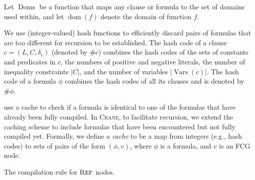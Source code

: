 \documentclass[letterpaper]{article} %
\DeclareMathOperator{\Reff}{\textsc{Ref}}
\DeclareMathOperator{\dom}{dom}
\DeclareMathOperator{\Doms}{Doms}
\DeclareMathOperator{\Vars}{Vars}
\theoremstyle{definition}
\begin{document}
Let $\Doms$ be a function that maps any clause or formula to the set of domains
used within, and let $\dom(f)$ denote the domain of function $f$.

We use (integer-valued) hash functions to efficiently discard pairs of formulas
that are too different for recursion to be established. The hash code of a
clause $c = (L, C, \delta_{c})$ (denoted by $\# c$) combines the hash codes of
the sets of constants and predicates in $c$, the numbers of positive and
negative literals, the number of inequality constraints $|C|$, and the number of
variables $|\Vars(c)|$. The hash code of a formula $\phi$ combines the hash
codes of all its clauses and is denoted by $\#\phi$.

\citet{DBLP:conf/ijcai/BroeckTMDR11} use a cache to check if a formula is
identical to one of the formulas that have already been fully compiled. In
\textsc{Crane}, to facilitate recursion, we extend the caching scheme to include
formulas that have been encountered but not fully compiled yet. Formally, we
define a \emph{cache} to be a map from integers (e.g., hash codes) to sets of
pairs of the form $(\phi, v)$, where $\phi$ is a formula, and $v$ is an FCG
node.

\begin{algorithm}[t]
  \caption{The compilation rule for $\Reff$ nodes.}\label{alg:trycache}

  \ForEach{formula and node $(\psi, v) \in C(\#\phi)$}{
    $\rho \gets \identifyRecursion{$\phi$, $\psi$}$\;
    \lIf{$\rho \ne {\normalfont \texttt{null}}$}{\Return{$\{\, (\Reff_\rho(v), \langle\rangle) \,\}$}}
  }
  \Return{$\emptyset$}\;

\end{algorithm}
\end{document}

